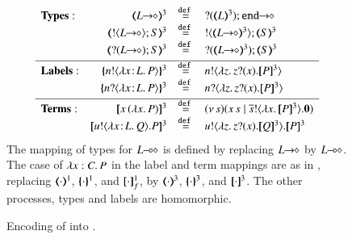 \begin{figure}[t]
\[
\begin{array}{lrcll}
\noindent{\bf Types:} & 
		\tmap{\shot{L}}{3} &\defeq& \shot{\btinp{\tmap{L}{3}} \tinact}
		\\
&		\tmap{\btout{\shot{L}} S}{3} &\defeq& \btout{\tmap{\shot{L}}{3}} \tmap{S}{3}
		\\
&		\tmap{\btinp{\shot{L}} S}{3} &\defeq& \btinp{\tmap{\shot{L}}{3}} \tmap{S}{3}
\\[1mm]
\hline
\noindent{\bf Labels:} & 
		\mapa{\bactout{n}{\abs{\AT{x}{L}}{P}}}^{3} &\defeq& \bactout{n}{\abs{z}{\binp{z}{x} \pmap{P}{3}}}
		\\
&		\mapa{\bactinp{n}{\abs{\AT{x}{L}}{P}}}^{3} &\defeq& \bactinp{n}{\abs{z}{\binp{z}{x} \pmap{P}{3}}}
\\[1mm]
\hline
{\bf Terms}: & 
	\pmap{\appl{x}{(\abs{x} P)}}{3} &\defeq& \newsp{s}{\appl{x}{s} \Par \bout{\dual{s}}{\abs{x} \pmap{P}{3}} \inact}
		\\
&	\pmap{\bout{u}{\abs{\AT{x}{L}}{Q}} P}{3} &\defeq& \bout{u}{\abs{z}{\binp{z}{x} \pmap{Q}{3}}} \pmap{P}{3}
	\end{array}
	\]
The mapping of types for $L\!\! \multimap\!\! \diamond$ is defined by replacing 
$L\!\! \rightarrow\!\! \diamond$ by $L\!\! \multimap\!\! \diamond$. 
The case of $\lambda x:C.\,P$ in the label and term mappings 
are %
as in , replacing 
$(\!\!\langle\cdot\rangle\!\!)^{1}$,
$\{\!\!\{\cdot\}\!\!\}^{1}$, and 
$[\!\![\cdot]\!\!]^1_f$, by  
$(\!\!\langle\cdot\rangle\!\!)^{3}$,
$\{\!\!\{\cdot\}\!\!\}^{3}$, and 
$[\!\![\cdot]\!\!]^3$. 
The other processes, types and labels are  homomorphic. \\
\caption{\label{f:enc:hopip_to_hopi} 
Encoding of \HOpp into \HOp.
}
\Hlinefig
\end{figure} 

